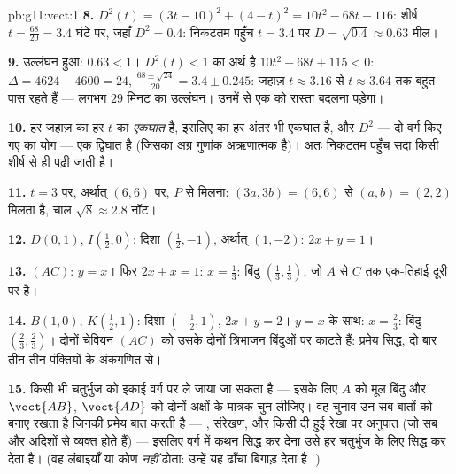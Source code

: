 \begin{solution}{pb:g11:vect:1}
\textbf{8.} $D^2(t) = (3t - 10)^2 + (4 - t)^2 =
10t^2 - 68t + 116$: शीर्ष $t = \frac{68}{20} = 3.4$ घंटे पर, जहाँ $D^2 = 0.4$: निकटतम पहुँच $t = 3.4$ पर
$D = \sqrt{0.4} \approx 0.63$ मील।

\textbf{9.} उल्लंघन हुआ: $0.63 < 1$। $D^2(t) < 1$ का अर्थ है $10t^2 - 68t + 115 < 0$: $\Delta = 4624 - 4600 = 24$,  $\frac{68 \pm \sqrt{24}}{20} = 3.4 \pm 0.245$:
जहाज़ $t \approx 3.16$ से $t \approx 3.64$ तक बहुत पास रहते हैं --- लगभग $29$ मिनट का उल्लंघन।
उनमें से एक को रास्ता बदलना पड़ेगा।

\textbf{10.} हर जहाज़ का हर  $t$ का \emph{एकघात}  है, इसलिए
 का हर अंतर भी एकघात है, और $D^2$ --- दो वर्ग किए गए 
का योग --- एक द्विघात है (जिसका अग्र गुणांक अऋणात्मक है)। अतः निकटतम पहुँच
सदा किसी शीर्ष से ही पढ़ी जाती है।

\textbf{11.} $t = 3$ पर, अर्थात् $(6, 6)$ पर, $P$ से मिलना: $(3a, 3b) = (6, 6)$ से $(a, b) = (2, 2)$
मिलता है, चाल $\sqrt{8} \approx 2.8$ नॉट।

\textbf{12.} $D(0, 1)$, $I\left(\frac12, 0\right)$: दिशा $\left(\frac12, -1\right)$, अर्थात् $(1, -2)$:  $2x + y = 1$।

\textbf{13.} $(AC)$: $y = x$। फिर $2x + x = 1$: $x = \frac13$: बिंदु $\left(\frac13, \frac13\right)$, जो $A$ से $C$
तक एक-तिहाई दूरी पर है।

\textbf{14.} $B(1, 0)$, $K\left(\frac12, 1\right)$: दिशा $\left(-\frac12, 1\right)$,  $2x + y = 2$। $y = x$ के साथ: $x = \frac23$:
बिंदु $\left(\frac23, \frac23\right)$। दोनों चेवियन $(AC)$ को उसके दोनों त्रिभाजन बिंदुओं पर काटते हैं:
प्रमेय सिद्ध, दो बार तीन-तीन पंक्तियों के अंकगणित से।

\textbf{15.} किसी भी  चतुर्भुज को इकाई वर्ग पर ले जाया जा सकता है ---
इसके लिए $A$ को मूल बिंदु और $\vect{AB}$, $\vect{AD}$ को दोनों अक्षों के मात्रक चुन
लीजिए। वह चुनाव उन सब बातों को बनाए रखता है जिनकी प्रमेय बात करती है ---
, संरेखण, और किसी दी हुई रेखा पर अनुपात (जो सब  और अदिशों से
व्यक्त होते हैं) --- इसलिए वर्ग में कथन सिद्ध कर देना उसे हर  चतुर्भुज
के लिए सिद्ध कर देता है। (वह लंबाइयाँ या कोण \emph{नहीं} ढोता: उन्हें यह
ढाँचा बिगाड़ देता है।)


\end{solution}
